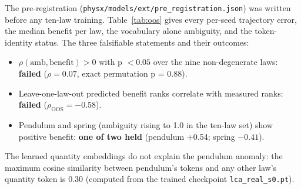 \documentclass[11pt,a4paper]{article}
\begin{document}
The pre-registration (\texttt{physx/models/ext/pre\_registration.json}) was
written before any ten-law training. Table~\ref{tab:oos} gives every
per-seed trajectory error, the median benefit per law, the vocabulary
alone ambiguity, and the token-identity status. The three falsifiable
statements and their outcomes:\par\smallskip
\begin{itemize}[leftmargin=1.6em,itemsep=0.15em]
  \item $\rho(\mathrm{amb}, \mathrm{benefit}) > 0$ with p $< 0.05$ over the
  nine non-degenerate laws: \textbf{failed} ($\rho = 0.07$, exact
  permutation p = 0.88).
  \item Leave-one-law-out predicted benefit ranks correlate with measured
  ranks: \textbf{failed} ($\rho_{\mathrm{OOS}} = -0.58$).
  \item Pendulum and spring (ambiguity rising to 1.0 in the ten-law set)
  show positive benefit: \textbf{one of two held} (pendulum +0.54; spring
  $-0.41$).
\end{itemize}

The learned quantity embeddings do not explain the pendulum anomaly: the
maximum cosine similarity between pendulum's tokens and any other law's
quantity token is 0.30 (computed from the trained checkpoint
\texttt{lca\_real\_s0.pt}).
\end{document}
